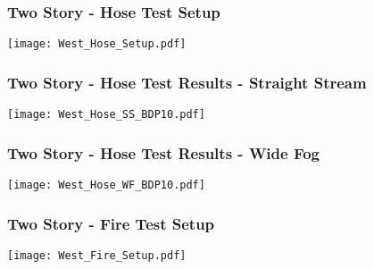 \documentclass[t]{beamer}
\begin{document}

\begin{frame}
\frametitle{Two Story - Hose Test Setup}
\centerline{\texttt{[image: West\_Hose\_Setup.pdf]}}
\end{frame}

\begin{frame}%
\frametitle{Two Story - Hose Test Results - Straight Stream}
\centerline{\texttt{[image: West\_Hose\_SS\_BDP10.pdf]}}
\end{frame}

\begin{frame}%
\frametitle{Two Story - Hose Test Results - Wide Fog}
\centerline{\texttt{[image: West\_Hose\_WF\_BDP10.pdf]}}
\end{frame}


\begin{frame}
\frametitle{Two Story - Fire Test Setup}
\centerline{\texttt{[image: West\_Fire\_Setup.pdf]}}
\end{frame}
\end{document}
